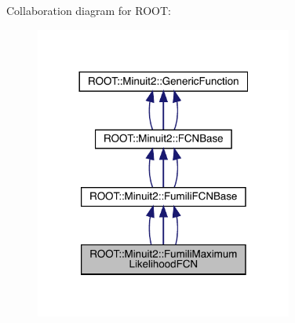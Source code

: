 Collaboration diagram for R\+O\+OT\+:
\nopagebreak
\begin{figure}[H]
\begin{center}
\leavevmode
\includegraphics[width=240pt]{d8/d03/classROOT_1_1Minuit2_1_1FumiliMaximumLikelihoodFCN__coll__graph}
\end{center}
\end{figure}
